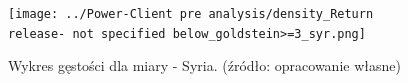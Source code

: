 \documentclass[11pt]{report}
\begin{document}
    \begin{figure}[tp]
        \centering
        \texttt{[image: ../Power-Client pre analysis/density\_Return release- not specified below\_goldstein>=3\_syr.png]}
        \caption{Wykres gęstości dla miary - Syria. (źródło: opracowanie własne)}
        \label{fig:density_Return release- not specified below_goldstein>=3_syr}
    \end{figure}
\end{document}
